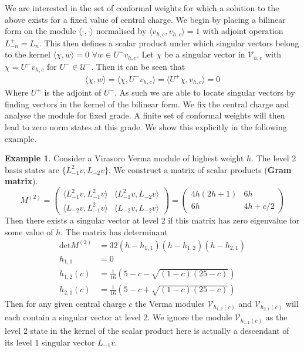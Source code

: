 \documentclass[a4paper,reqno,12pt]{report}
\theoremstyle{definition}
\newtheorem{exmp}{Example}[section]
\newcommand{\bra}{\langle}
\newcommand{\ket}{\rangle}
\numberwithin{equation}{section}
\theoremstyle{plain}
\begin{document}
We are interested in the set of conformal weights for which a solution to the above exists for a fixed value of central charge. We begin by placing a bilinear form on the module $\bra \cdot,\cdot \ket$ normalised by $\bra v_{h,c},v_{h,c}\ket =1$ with adjoint operation $L_{-n}^+ = L_n$. This then defines a scalar product under which singular vectors belong to the kernel $\bra \chi,w \ket=0$ $ \forall w\in U^- v_{h,c}$. Let $\chi$ be a singular vector in $\mathcal{V}_{h,c}$ with $\chi=U^-v_{h,c} $ for $U^-\in \mathcal{U}^-$. Then it can be seen that
\begin{align*}
\bra \chi, w \ket = \bra \chi, U^-v_{h,c} \ket = \bra U^+\chi, v_{h,c} \ket = 0
\end{align*}
Where $U^+$ is the adjoint of $U^-$. As such we are able to locate singular vectors by finding vectors in the kernel of the bilinear form. We fix the central charge and analyse the module for fixed grade. A finite set of conformal weights will then lead to zero norm states at this grade. We show this explicitly in the following example. 

\begin{exmp}
Consider a Virasoro Verma module of highest weight $h$. The level 2 basis states are $\{L_{-1}^2v, L_{-2}v\}$. We construct a matrix of scalar products ({\bf Gram matrix}).
\[
M^{(2)} = 
\begin{pmatrix}
\bra L_{-1}^2v, L_{-1}^2v\ket & \bra L_{-1}^2v, L_{-2}v\ket \\
\bra L_{-2}v, L_{-1}^2v \ket & \bra L_{-2}v, L_{-2}v\ket
\end{pmatrix}
=
\begin{pmatrix}
4h(2h+1) & 6h \\
6h & 4h + c/2
\end{pmatrix}
\]
Then there exists a singular vector at level 2 if this matrix has zero eigenvalue for some value of $h$. The matrix has determinant
\begin{align*}
\text{det} M^{(2)} &= 32(h-h_{1,1})(h-h_{1,2})(h -h_{2,1})\\
h_{1,1}&=0\\
h_{1,2}(c)& = \frac{1}{16}(5-c-\sqrt{(1-c)(25-c)})\\
h_{2,1}(c)& = \frac{1}{16}(5-c+\sqrt{(1-c)(25-c)})
\end{align*}
Then for any given central charge $c$ the Verma modules $\mathcal{V}_{h_{1,2}(c)}$ and $\mathcal{V}_{h_{2,1}(c)}$ will each contain a singular vector at level 2. We ignore the module $\mathcal{V}_{h_{1,1}(c)}$ as the level 2 state in the kernel of the scalar product here is actually a descendant of its level 1 singular vector $L_{-1}v$. 
\end{exmp}
\end{document}
